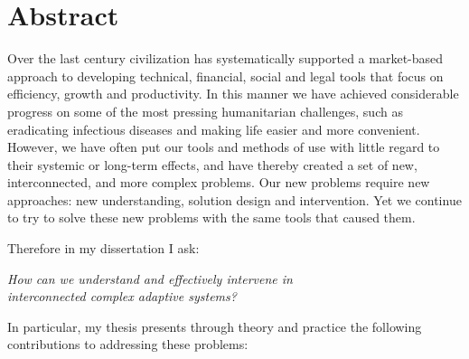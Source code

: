 


\begingroup
\let\clearpage\relax
\let\cleardoublepage\relax
\let\cleardoublepage\relax

\chapter*{Abstract}

Over the last century civilization has systematically supported a market-based approach to developing technical, financial, social and legal tools that focus on efficiency, growth and productivity. In this manner we have achieved considerable progress on some of the most pressing humanitarian challenges, such as eradicating infectious diseases and making life easier and more convenient. However, we have often put our tools and methods of use with little regard to their systemic or long-term effects, and have thereby created a set of new, interconnected, and more complex problems. Our new problems require new approaches: new understanding, solution design and intervention. Yet we continue to try to solve these new problems with the same tools that caused them.

\medskip

Therefore in my dissertation I ask:

\begin{center}
\textit{How can we understand and effectively intervene in\\
interconnected complex adaptive systems?}

\end{center}

In particular, my thesis presents through theory and practice the following contributions to addressing these problems:

